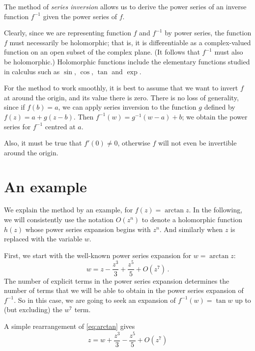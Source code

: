 \documentclass[12pt]{article}
\begin{document}
The method of \emph{series inversion} allows us to derive the power series
of an inverse function $f^{-1}$ given the power series of $f$.

Clearly, since we are representing function $f$ and $f^{-1}$ by power series,
the function $f$ must necessarily be holomorphic; that is, it is differentiable
as a complex-valued function on an open subset of the complex plane.
(It follows that $f^{-1}$ must also be holomorphic.)
Holomorphic functions include the elementary functions studied in calculus
such as $\sin$, $\cos$, $\tan$ and $\exp$.

For the method to work smoothly, it is best to assume that we want
to invert $f$ at around the origin, and its value there is zero.
There is no loss of generality, since
if $f(b) = a$, we can apply series inversion to the function $g$ defined
by $f(z) = a + g(z-b)$.
Then $f^{-1}(w) = g^{-1}(w-a) + b$;
we obtain the power series for $f^{-1}$ centred at $a$.

Also, it must be true that $f'(0) \neq 0$, otherwise $f$ will not even
be invertible around the origin.

\section*{An example}

We explain the method by an example, for $f(z) = \arctan z$.
In the following, we will consistently use the notation $O(z^n)$
to denote a holomorphic function $h(z)$ whose power series expansion begins
with $z^n$.  And similarly when $z$ is replaced with the variable $w$.

First, we start with the well-known power series expansion for $w = \arctan z$:
\begin{equation}
\label{eq:arctan}
w = z - \frac{z^3}{3} + \frac{z^5}{5} + O(z^7)\,.
\end{equation}
The number of explicit terms in the power series expansion determines
the number of terms that we will be able to obtain
in the power series expansion of $f^{-1}$.
So in this case, we are going to seek an expansion
of $f^{-1}(w) = \tan w$ up to (but excluding) the $w^7$ term.

A simple rearrangement of \eqref{eq:arctan} gives
\begin{equation}
\label{eq:z}
z = w + \frac{z^3}{3} - \frac{z^5}{5} + O(z^7)
\end{equation}
\end{document}
